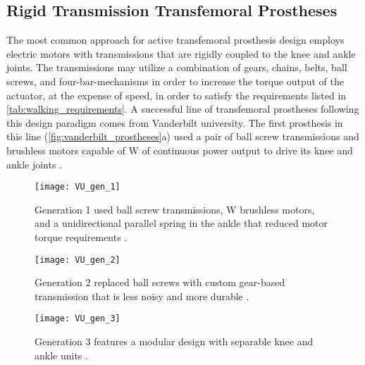 \subsection{Rigid Transmission Transfemoral
Prostheses}\label{sec:back_rigid_trans} 

The most common approach for active transfemoral prosthesis design employs
electric motors with transmissions that are rigidly coupled to the knee and
ankle joints.  The transmissions may utilize a combination of gears, chains,
belts, ball screws, and four-bar-mechanisms in order to increase the torque
output of the actuator, at the expense of speed, in order to satisfy the
requirements listed in \cref{tab:walking_requirements}. A successful line of
transfemoral prostheses following this design paradigm comes from Vanderbilt
university. The first prosthesis in this line
(\cref{fig:vanderbilt_prostheses}a) used a pair of ball screw transmissions and
brushless motors capable of \unit[200]{W} of continuous power output to drive
its knee and ankle joints
\citep{sup2009preliminary}. 
\begin{figure*}[t]
    \centering
	\begin{subfigure}[t]{0.32\linewidth}
    	\centering
        \texttt{[image: VU\_gen\_1]}
        \caption{Generation 1 used ball screw transmissions, \unit[200]{W}
        brushless motors, and a unidirectional parallel spring in the ankle that
        reduced motor torque requirements \citep{sup2009preliminary}.}
        \label{fig:vanderbilt_gen_1}
	\end{subfigure}
	\begin{subfigure}[t]{0.32\linewidth}
    	\centering
        \texttt{[image: VU\_gen\_2]}
        \caption{Generation 2 replaced ball screws with custom gear-based
        transmission that is less noisy and more durable
        \citep{lawson2013control}.}
        \label{fig:vanderbilt_gen_2}
	\end{subfigure}
	\begin{subfigure}[t]{0.32\linewidth}
    	\centering
        \texttt{[image: VU\_gen\_3]}
        \caption{Generation 3 features a modular design with separable knee and
        ankle units \citep{lawson2014robotic}.}
        \label{fig:vanderbilt_gen_3}
	\end{subfigure}
    \caption{Vanderbilt University's Robotic Transfemoral Prostheses.}
    \label{fig:vanderbilt_prostheses}
\end{figure*}

